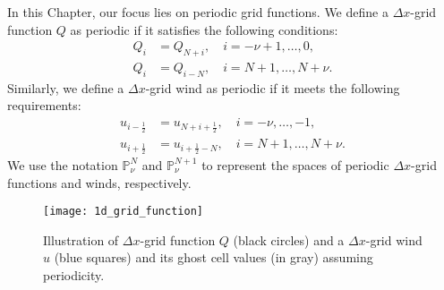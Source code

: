 In this Chapter, our focus lies on periodic grid functions.
We define a $\Delta x$-grid function $Q$ as periodic if it satisfies the following conditions:
\begin{align*}
    Q_{i} &= Q_{N+i}, \quad i=-\nu+1, \ldots, 0,\\
    Q_{i} &= Q_{i-N}, \quad i=N+1, \ldots, N+\nu.
\end{align*}
Similarly, we define a $\Delta x$-grid wind as periodic if it meets the following requirements:
\begin{align*}
    u_{i-\frac{1}{2}} &= u_{N+i+\frac{1}{2}} , \quad i=-\nu, \ldots, -1,\\
    u_{i+\frac{1}{2}} &= u_{i+\frac{1}{2}-N} , \quad i=N+1, \ldots, N+\nu.
\end{align*}
We use the notation $\mathbb{P}^{N}_{\nu}$ and $\mathbb{P}^{N+1}_{\nu}$ to
represent the spaces of periodic $\Delta x$-grid functions and winds, respectively.
\begin{figure}[!htb] 
\centering 
\texttt{[image: 1d\_grid\_function]} 
\caption{Illustration of $\Delta x$-grid function $Q$ (black circles)
and a $\Delta x$-grid wind $u$ (blue squares) and its ghost cell
values (in gray) assuming periodicity.\label{chp-adv1d-sec1-grid1d-function}}
\end{figure}

